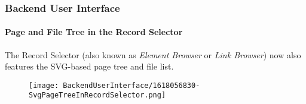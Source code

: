 %

\begin{frame}[fragile]
	\frametitle{Backend User Interface}
	\framesubtitle{Page and File Tree in the Record Selector}

	The Record Selector (also known as \textit{Element Browser} or \textit{Link Browser})
	now also features the SVG-based page tree and file list.

	\begin{figure}
		\texttt{[image: BackendUserInterface/1618056830-SvgPageTreeInRecordSelector.png]}
	\end{figure}

\end{frame}

